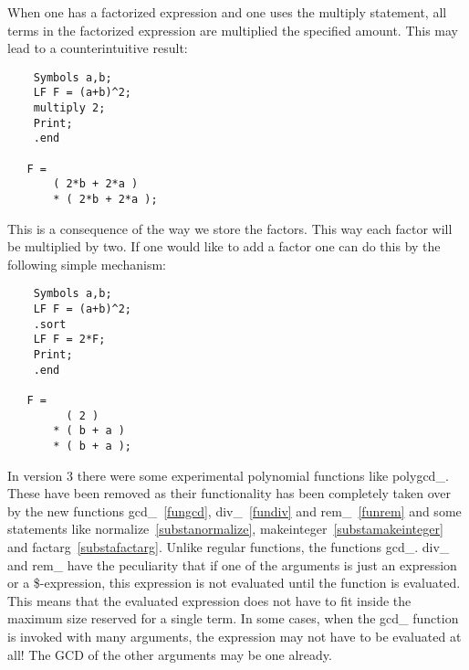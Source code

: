 \noindent When one has a factorized expression and one uses the multiply 
statement, all terms in the factorized expression are multiplied the 
specified amount. This may lead to a counterintuitive result:
\begin{verbatim}
    Symbols a,b;
    LF F = (a+b)^2;
    multiply 2;
    Print;
    .end

   F =
       ( 2*b + 2*a )
       * ( 2*b + 2*a );
\end{verbatim}
This is a consequence of the way we store the factors. This way each factor 
will be multiplied by two. If one would like to add a factor one can do 
this by the following simple mechanism:
\begin{verbatim}
    Symbols a,b;
    LF F = (a+b)^2;
    .sort
    LF F = 2*F;
    Print;
    .end

   F =
         ( 2 )
       * ( b + a )
       * ( b + a );
\end{verbatim}

\noindent In version 3 there were some experimental polynomial functions 
like polygcd\_. These have been 
removed as their functionality has been completely taken over by the new 
functions gcd\_~\ref{fungcd}, div\_~\ref{fundiv} and rem\_~\ref{funrem} and 
some statements like normalize~\ref{substanormalize}, 
makeinteger~\ref{substamakeinteger} and factarg~\ref{substafactarg}. Unlike 
regular functions, the functions gcd\_. div\_ and rem\_ have the 
peculiarity that if one of the arguments is just an expression or a 
\$-expression, this expression is not evaluated until the function is 
evaluated. This means that the evaluated expression does not have to fit 
inside the maximum size reserved for a single term. In some cases, when the 
gcd\_ function is invoked with many arguments, the expression may not have 
to be evaluated at all! The GCD of the other arguments may be one already.


